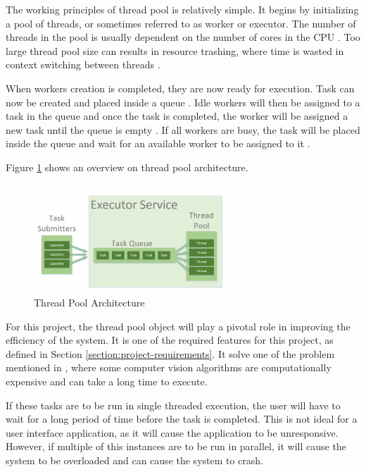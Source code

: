 The working principles of thread pool is relatively simple. It begins by initializing a pool of threads, or sometimes referred to as worker or executor. The number of threads in the pool is usually dependent on the number of cores in the CPU \cite{GeekforGeek_2020}. Too large thread pool size can results in resource trashing, where time is wasted in context switching between threads \cite{GeekforGeek_2020}.

When workers creation is completed, they are now ready for execution. Task can now be created and placed inside a queue \cite{GeekforGeek_2020}. Idle workers will then be assigned to a task in the queue and once the task is completed, the worker will be assigned a new task until the queue is empty \cite{GeekforGeek_2020}. If all workers are busy, the task will be placed inside the queue and wait for an available worker to be assigned to it \cite{GeekforGeek_2020}.

Figure \ref{fig:thread-pool} shows an overview on thread pool architecture.

\begin{figure}[!ht]
    \centering
    \includegraphics[width=0.65\textwidth]{texs/Part2/chapter1/image/threadpool.png}
    \caption{Thread Pool Architecture \cite{Paraschiv_2023}}
    \label{fig:thread-pool}
\end{figure}

For this project, the thread pool object will play a pivotal role in improving the efficiency of the system. It is one of the required features for this project, as defined in Section \ref{section:project-requirements}. It solve one of the problem mentioned in \cite{Sabtu_2023}, where some computer vision algorithms are computationally expensive and can take a long time to execute.

If these tasks are to be run in single threaded execution, the user will have to wait for a long period of time before the task is completed. This is not ideal for a user interface application, as it will cause the application to be unresponsive. However, if multiple of this instances are to be run in parallel, it will cause the system to be overloaded and can cause the system to crash.

